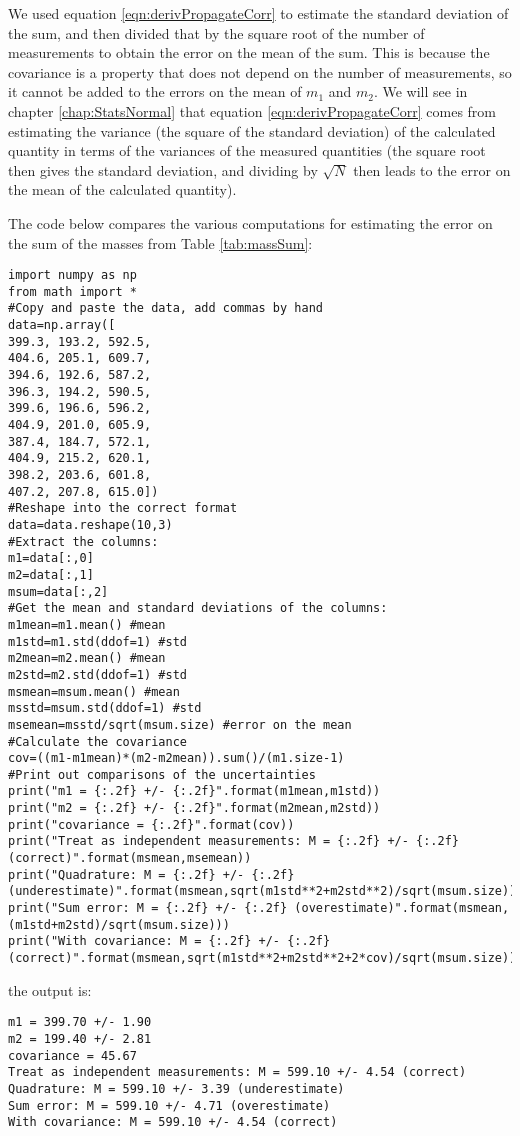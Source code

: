 We used equation \ref{eqn:derivPropagateCorr} to estimate the standard deviation of the sum, and then divided that by the square root of the number of measurements to obtain the error on the mean of the sum. This is because the covariance is a property that does not depend on the number of measurements, so it cannot be added to the errors on the mean of $m_1$ and $m_2$. We will see in chapter \ref{chap:StatsNormal} that equation \ref{eqn:derivPropagateCorr} comes from estimating the variance (the square of the standard deviation) of the calculated quantity in terms of the variances of the measured quantities (the square root then gives the standard deviation, and dividing by $\sqrt{N}$ then leads to the error on the mean of the calculated quantity).

The code below compares the various computations for estimating the error on the sum of the masses from Table \ref{tab:massSum}:
\begin{lstlisting}[frame=single] 
import numpy as np
from math import *
#Copy and paste the data, add commas by hand
data=np.array([
399.3, 193.2, 592.5,
404.6, 205.1, 609.7,
394.6, 192.6, 587.2,
396.3, 194.2, 590.5,
399.6, 196.6, 596.2,
404.9, 201.0, 605.9,
387.4, 184.7, 572.1,
404.9, 215.2, 620.1,
398.2, 203.6, 601.8,
407.2, 207.8, 615.0])
#Reshape into the correct format
data=data.reshape(10,3)
#Extract the columns:
m1=data[:,0]
m2=data[:,1]
msum=data[:,2]
#Get the mean and standard deviations of the columns:
m1mean=m1.mean() #mean
m1std=m1.std(ddof=1) #std
m2mean=m2.mean() #mean
m2std=m2.std(ddof=1) #std
msmean=msum.mean() #mean
msstd=msum.std(ddof=1) #std
msemean=msstd/sqrt(msum.size) #error on the mean
#Calculate the covariance
cov=((m1-m1mean)*(m2-m2mean)).sum()/(m1.size-1)
#Print out comparisons of the uncertainties
print("m1 = {:.2f} +/- {:.2f}".format(m1mean,m1std))
print("m2 = {:.2f} +/- {:.2f}".format(m2mean,m2std))
print("covariance = {:.2f}".format(cov))
print("Treat as independent measurements: M = {:.2f} +/- {:.2f} (correct)".format(msmean,msemean))
print("Quadrature: M = {:.2f} +/- {:.2f} (underestimate)".format(msmean,sqrt(m1std**2+m2std**2)/sqrt(msum.size)))
print("Sum error: M = {:.2f} +/- {:.2f} (overestimate)".format(msmean,(m1std+m2std)/sqrt(msum.size)))
print("With covariance: M = {:.2f} +/- {:.2f} (correct)".format(msmean,sqrt(m1std**2+m2std**2+2*cov)/sqrt(msum.size)))
\end{lstlisting}
the output is:
\begin{verbatim}
m1 = 399.70 +/- 1.90
m2 = 199.40 +/- 2.81
covariance = 45.67
Treat as independent measurements: M = 599.10 +/- 4.54 (correct)
Quadrature: M = 599.10 +/- 3.39 (underestimate)
Sum error: M = 599.10 +/- 4.71 (overestimate)
With covariance: M = 599.10 +/- 4.54 (correct)
\end{verbatim}


